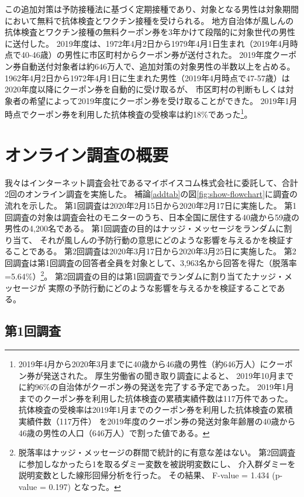 \documentclass[
  11pt,
  a4paper,
]{article}
\begin{document}
この追加対策は予防接種法に基づく定期接種であり、対象となる男性は対象期間において無料で抗体検査とワクチン接種を受けられる。
地方自治体が風しんの抗体検査とワクチン接種の無料クーポン券を3年かけて段階的に対象世代の男性に送付した。
2019年度は、1972年4月2日から1979年4月1日生まれ（2019年4月時点で40-46歳）の男性に市区町村からクーポン券が送付された。
2019年度クーポン券自動送付対象者は約646万人で、追加対策の対象男性の半数以上を占める。
1962年4月2日から1972年4月1日に生まれた男性（2019年4月時点で47-57歳）は2020年度以降にクーポン券を自動的に受け取るが、
市区町村の判断もしくは対象者の希望によって2019年度にクーポン券を受け取ることができた。
2019年1月時点でクーポン券を利用した抗体検査の受検率は約18\%であった\footnote{2019年4月から2020年3月までに40歳から46歳の男性（約646万人）にクーポン券が発送された。
  厚生労働省の聞き取り調査によると、
  2019年10月までに約96\%の自治体がクーポン券の発送を完了する予定であった。
  2019年1月までのクーポン券を利用した抗体検査の累積実績件数は117万件であった。
  抗体検査の受検率は2019年1月までのクーポン券を利用した抗体検査の累積実績件数（117万件）
  を2019年度のクーポン券の発送対象年齢層の40歳から46歳の男性の人口（646万人）で割った値である。
}。

\hypertarget{experiment}{%
\section{オンライン調査の概要}\label{experiment}}

我々はインターネット調査会社であるマイボイスコム株式会社に委託して、合計2回のオンライン調査を実施した。
補論\ref{addtab}の図\ref{fig:show-flowchart}に調査の流れを示した。
第1回調査は2020年2月15日から2020年2月17日に実施した。
第1回調査の対象は調査会社のモニターのうち、日本全国に居住する40歳から59歳の男性の4,200名である。
第1回調査の目的はナッジ・メッセージをランダムに割り当て、
それが風しんの予防行動の意思にどのような影響を与えるかを検証することである。
第2回調査は2020年3月17日から2020年3月25日に実施した。
第2回調査は第1回調査の回答者全員を対象として、3,963名から回答を得た（脱落率=5.64\%）\footnote{脱落率はナッジ・メッセージの群間で統計的に有意な差はない。
  第2回調査に参加しなかったら1を取るダミー変数を被説明変数にし、
  介入群ダミーを説明変数とした線形回帰分析を行った。
  その結果、
  F-value = 1.434 (p-value = 0.197)
  となった。}。
第2回調査の目的は第1回調査でランダムに割り当てたナッジ・メッセージが
実際の予防行動にどのような影響を与えるかを検証することである。

\hypertarget{wave1}{%
\subsection{第1回調査}\label{wave1}}
\end{document}
